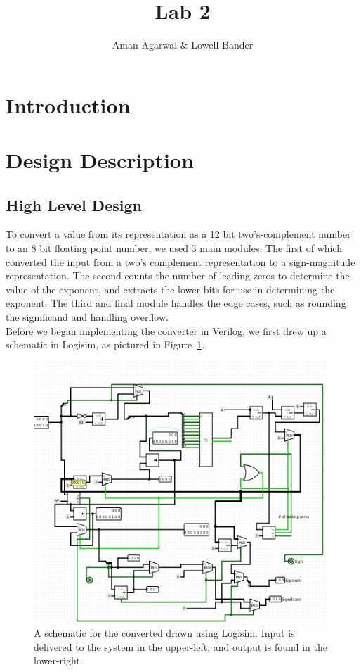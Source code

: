 \documentclass[]{article}
\newcommand{\subtitle}[1]{%
  \posttitle{%
    \par\end{center}
    \begin{center}\large#1\end{center}
    \vskip0.5em}%
}
\begin{document}
\title{Lab 2}
\subtitle{CS M152A}
\author{Aman Agarwal \& Lowell Bander}

\maketitle
\tableofcontents \newpage

\section{Introduction}
\section{Design Description}

\subsection{High Level Design}
\label{subsec:highlevel}

To convert a value from its representation as a 12 bit two's-complement number to an 8 bit floating point number, we used 3 main modules. The first of which converted the input from a two's complement representation to a sign-magnitude representation. The second counts the number of leading zeros to determine the value of the exponent, and extracts the lower bits for use in determining the exponent. The third and final module handles the edge cases, such as rounding the significand and handling overflow.\\

Before we began implementing the converter in Verilog, we first drew up a schematic in Logisim, as pictured in Figure~\ref{fig:logisim}.\\

\begin{figure}[H]
\centering
\includegraphics[width=11cm]{logisim.PNG}
\caption{A schematic for the converted drawn using Logisim. Input is delivered to the system in the upper-left, and output is found in the lower-right.}
\label{fig:logisim}
\end{figure}
\end{document}
